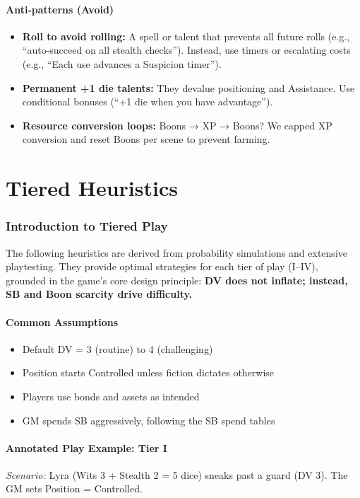 \documentclass[11pt]{article}
\begin{document}
\subsection{Anti‑patterns (Avoid)}
\begin{itemize}
    \item \textbf{Roll to avoid rolling:} A spell or talent that prevents all future rolls (e.g., “auto‑succeed on all stealth checks”). Instead, use timers or escalating costs (e.g., “Each use advances a Suspicion timer”).
    \item \textbf{Permanent +1 die talents:} They devalue positioning and Assistance. Use conditional bonuses (“+1 die when you have advantage”).
    \item \textbf{Resource conversion loops:} Boons → XP → Boons? We capped XP conversion and reset Boons per scene to prevent farming.
\end{itemize}

\newpage

\part{Tiered Heuristics}

\section{Introduction to Tiered Play}

The following heuristics are derived from probability simulations and extensive playtesting. They provide optimal strategies for each tier of play (I–IV), grounded in the game's core design principle: \textbf{DV does not inflate; instead, SB and Boon scarcity drive difficulty.}

\subsection{Common Assumptions}
\begin{itemize}
    \item Default DV = 3 (routine) to 4 (challenging)
    \item Position starts Controlled unless fiction dictates otherwise
    \item Players use bonds and assets as intended
    \item GM spends SB aggressively, following the SB spend tables
\end{itemize}

\subsection{Annotated Play Example: Tier I}
\label{ex:tier1}
\textit{Scenario:} Lyra (Wits 3 + Stealth 2 = 5 dice) sneaks past a guard (DV 3). The GM sets Position = Controlled.
\end{document}

